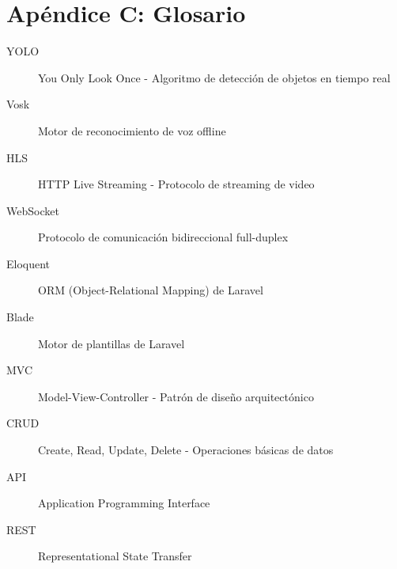 \documentclass[12pt,a4paper]{article}
\begin{document}
\section{Apéndice C: Glosario}

\begin{description}
    \item[YOLO] You Only Look Once - Algoritmo de detección de objetos en tiempo real
    \item[Vosk] Motor de reconocimiento de voz offline
    \item[HLS] HTTP Live Streaming - Protocolo de streaming de video
    \item[WebSocket] Protocolo de comunicación bidireccional full-duplex
    \item[Eloquent] ORM (Object-Relational Mapping) de Laravel
    \item[Blade] Motor de plantillas de Laravel
    \item[MVC] Model-View-Controller - Patrón de diseño arquitectónico
    \item[CRUD] Create, Read, Update, Delete - Operaciones básicas de datos
    \item[API] Application Programming Interface
    \item[REST] Representational State Transfer
\end{description}
\end{document}
